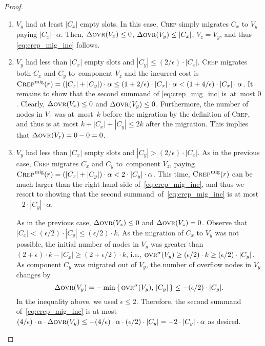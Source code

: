 \documentclass{siamart190516}
\newcommand{\CREP}{\textsc{Crep}\xspace}
\newcommand{\CREPmig}{\CREP^\textnormal{mig}}
\newcommand{\ovr}{\textsc{ovr}}
\newcommand{\eps}{\ensuremath{\epsilon}}
\begin{document}
\begin{proof}
\begin{enumerate}
\item 
$V_y$ had at least $|C_x|$ empty slots. In this case, \CREP simply migrates
$C_x$ to $V_y$ paying $|C_x| \cdot \alpha$. Then, $\Delta \ovr(V_x) \leq 0$,
$\Delta \ovr(V_y) \leq |C_x|$, $V_z = V_y$, and thus \eqref{eq:crep_mig_inc}
follows.

\item 
$V_y$ had less than $|C_x|$ empty slots and $|C_y| \leq (2/\eps) \cdot |C_x|$.
\CREP migrates both $C_x$ and $C_y$ to~component $V_z$ and the incurred cost is 
$\CREPmig(r) = (|C_x| + |C_y|) \cdot \alpha \leq (1+2/\eps) \cdot |C_x| \cdot \alpha
< (1 + 4/\eps) \cdot |C_x| \cdot \alpha$. 
It remains to show that the second summand of \eqref{eq:crep_mig_inc} is~at~most $0$. 
Clearly, $\Delta \ovr(V_x) \leq 0$ and $\Delta \ovr(V_y) \leq 0$. 
Furthermore, the number of 
nodes in $V_z$ was at~most~$k$ before the migration by the definition of \CREP,
and thus is at~most $k + |C_x| + |C_y| \leq 2k$ after the migration.
This implies that $\Delta \ovr(V_z) = 0 - 0 = 0$.

\item 
$V_y$ had less than $|C_x|$ empty slots and $|C_y| > (2/\eps) \cdot |C_x|$.
As in the previous case, \CREP migrates $C_x$ and $C_y$ to~component $V_z$, 
paying $\CREPmig(r) = (|C_x| + |C_y|) \cdot \alpha < 2 \cdot |C_y| \cdot \alpha$.
This time, $\CREPmig(r)$ can be much larger than the right hand side 
of~\eqref{eq:crep_mig_inc}, and thus we resort to showing that 
the second summand~of~\eqref{eq:crep_mig_inc} is at most $ - 2 \cdot |C_y| \cdot \alpha$.

As in the previous case, $\Delta \ovr(V_x) \leq 0$ and $\Delta \ovr(V_z) = 0$. 
Observe that $|C_x| < (\eps / 2) \cdot |C_y| \leq (\eps / 2) \cdot k$.
As the migration of $C_x$ to $V_y$ was not possible, the initial number
of nodes in $V_y$ was greater than $(2 + \eps) \cdot k - |C_x| \geq (2+\eps/2) \cdot k$,
i.e., $\ovr^\sigma(V_y) \geq (\eps/2) \cdot k \geq (\eps/2) \cdot |C_y|$. 
As component $C_y$ was migrated out of $V_y$, the number of overflow nodes in $V_y$ changes by
\[
	\Delta \ovr(V_y) 
		= - \min \left\{ \,\ovr^\sigma(V_y), \,|C_y| \,\right\}
		\leq - (\eps/2) \cdot |C_y|.
\]
In the inequality above, we used $\eps \leq 2$.
Therefore, the second summand of~\eqref{eq:crep_mig_inc} is at most 
$(4/\eps) \cdot \alpha \cdot \Delta\ovr(V_y) \leq - 
(4/\eps) \cdot \alpha \cdot (\eps/2) \cdot |C_y|
= - 2 \cdot |C_y| \cdot \alpha$ as desired.
\end{enumerate}
\end{proof}
\end{document}
